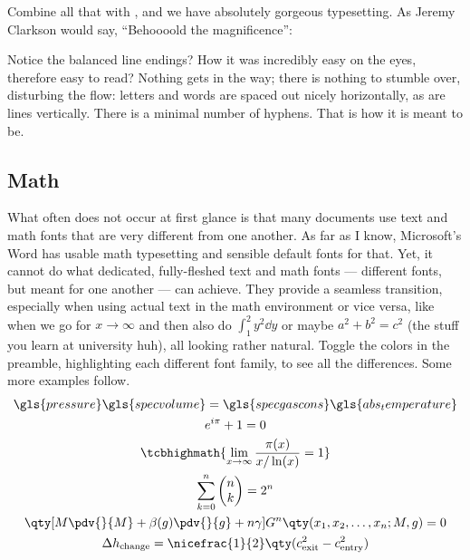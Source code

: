 Combine all that with , and we have absolutely gorgeous typesetting.
As Jeremy Clarkson would say, \enquote{Behoooold the magnificence}:

\vspace{1\baselineskip}
\parbox{0.9\linewidth}{%
\textcolor{g1}{\kant[1]}
}
\vspace{1\baselineskip}

\noindent Notice the balanced line endings?
How it was incredibly easy on the eyes, therefore easy to read?
Nothing gets in the way; there is nothing to stumble over, disturbing the flow: letters and words are spaced out nicely horizontally, as are lines vertically.
There is a minimal number of hyphens.
That is how it is meant to be.

\subsection{Math}
What often does not occur at first glance is that many documents use text and math fonts that are very different from one another.
As far as I know, Microsoft's Word has usable math typesetting and sensible default fonts for that.
Yet, it cannot do what dedicated, fully-fleshed text and math fonts --- different fonts, but meant for one another --- can achieve.
They provide a seamless transition, especially when using actual text in the math environment or vice versa, like when we go for \(x \to \infty\) and then also do \(\int_{1}^{2} y^2 \dd{y}\) or maybe \(a^2 + b^2 = c^2\) (the stuff you learn at university huh), all looking rather natural.
Toggle the colors in the preamble, highlighting each different font family, to see all the differences.
Some more examples follow.
\begin{gather}
	\gls{pressure}\gls{specvolume} = \gls{specgascons}\gls{abs_temperature}\label{eq:click_me}\\
	e^{i\pi} + 1 = 0\\
	\tcbhighmath{\lim\limits_{x \to \infty} \frac{\pi(x)}{x / \ln(x)} = 1}\label{eq:highlighted}\\
	\sum_{k = 0}^{n} %
	\begin{pmatrix}%
		n \\ k
	\end{pmatrix}%
	= 2^{n}\\
	\qty[M \pdv{}{M} + \beta(g) \pdv{}{g} + n\gamma] G^{n} \qty(x_{1}, x_{2}, \dots, x_{n}; M, g) = 0\\
	\Delta h_{\text{change}} = \nicefrac{1}{2}\qty(c^2_{\text{exit}} - c^2_{\text{entry}})
\end{gather}

